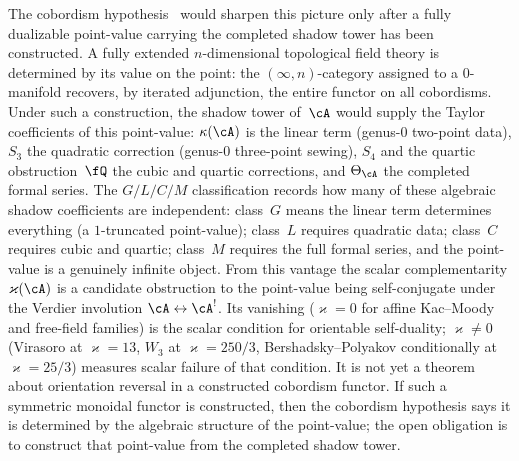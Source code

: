 \begin{remark}
The cobordism hypothesis~\cite{Lurie09TFT} would sharpen this picture
only after a fully dualizable point-value carrying the completed shadow
tower has been constructed.
A fully extended $n$-dimensional topological field theory is
determined by its value on the point: the $(\infty,n)$-category
assigned to a $0$-manifold recovers, by iterated adjunction, the
entire functor on all cobordisms.
Under such a construction, the shadow tower of~$\cA$ would supply the
Taylor coefficients of this point-value: $\kappa(\cA)$ is the linear term (genus-$0$
two-point data), $S_3$ the quadratic correction (genus-$0$
three-point sewing), $S_4$ and the quartic obstruction~$\fQ$ the
cubic and quartic corrections, and $\Theta_\cA$ the completed
formal series.
The $G/L/C/M$ classification records how many of these algebraic
shadow coefficients are independent: class~$G$ means the linear
term determines everything (a $1$-truncated point-value); class~$L$
requires quadratic data; class~$C$ requires cubic and quartic;
class~$M$ requires the full formal series, and the point-value is
a genuinely infinite object.
From this vantage the scalar complementarity $\varkappa(\cA)$ is a
candidate obstruction to the point-value being self-conjugate under the
Verdier involution $\cA \leftrightarrow \cA^!$. Its vanishing
($\varkappa = 0$ for affine Kac--Moody and free-field families) is the
scalar condition for orientable self-duality; $\varkappa \neq 0$
(Virasoro at $\varkappa = 13$, $W_3$ at $\varkappa = 250/3$,
Bershadsky--Polyakov conditionally at $\varkappa = 25/3$) measures scalar failure of
that condition. It is not yet a theorem about orientation reversal in a
constructed cobordism functor. If such a symmetric monoidal functor is
constructed, then the cobordism hypothesis says it is determined by
the algebraic structure of the point-value; the open obligation is to
construct that point-value from the completed shadow tower.
\end{remark}

